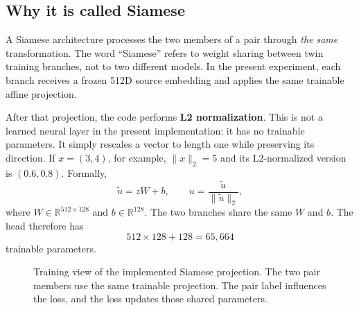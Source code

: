 \documentclass[10pt,a4paper]{article}
\begin{document}
\subsection{Why it is called Siamese}

A Siamese architecture processes the two members of a pair through \emph{the same}
transformation. The word ``Siamese'' refers to weight sharing between twin training branches,
not to two different models. In the present experiment, each branch receives a frozen 512D
source embedding and applies the same trainable affine projection.

After that projection, the code performs \textbf{L2 normalization}. This is not a learned
neural layer in the present implementation: it has no trainable parameters. It simply rescales
a vector to length one while preserving its direction. If $x=(3,4)$, for example,
$\|x\|_2=5$ and its L2-normalized version is $(0.6,0.8)$. Formally,
\begin{equation}
\tilde u = zW+b,\qquad u=\frac{\tilde u}{\|\tilde u\|_2},
\end{equation}
where $W\in\mathbb{R}^{512\times128}$ and $b\in\mathbb{R}^{128}$. The two branches share the
same $W$ and $b$. The head therefore has
\begin{equation}
512\times128+128=65{,}664
\end{equation}
trainable parameters.

\begin{figure}[ht]
\centering
{}
\caption{Training view of the implemented Siamese projection. The two pair members use the
same trainable projection. The pair label influences the loss, and the loss updates those
shared parameters.}
\label{fig:siamese}
\end{figure}
\end{document}
